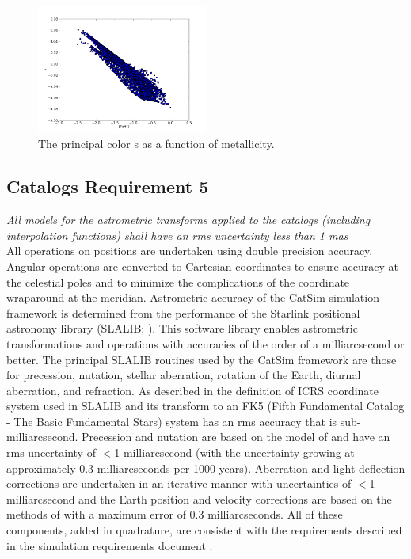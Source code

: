 \documentclass[11pt]{article}
\begin{document}
\begin{figure} [h]
\centering
\includegraphics[width=0.5\textwidth]{validation_figures/s_met.png}
\caption{The principal color s as a function of metallicity.\label{fig:sfeh}}
\end{figure}


\subsection{Catalogs Requirement 5}

{\it All models for the astrometric transforms applied to the catalogs
  (including interpolation functions) shall have an rms uncertainty less than 1 mas}\\

All operations on positions are undertaken using double precision
accuracy. Angular operations are converted to Cartesian coordinates to
ensure accuracy at the celestial poles and to minimize the
complications of the coordinate wraparound at the
meridian. Astrometric accuracy of the CatSim simulation framework is
determined from the performance of the Starlink positional astronomy
library (SLALIB; \citealt{wallace}). This software library enables
astrometric transformations and operations with accuracies of the
order of a milliarcsecond or better.  The principal SLALIB routines
used by the CatSim framework are those for precession, nutation,
stellar aberration, rotation of the Earth, diurnal aberration, and
refraction.  As described in \citet{wallace} the definition of ICRS
coordinate system used in SLALIB and its transform to an FK5 (Fifth
Fundamental Catalog - The Basic Fundamental Stars) system has an rms
accuracy that is sub-milliarcsecond. Precession and nutation are based
on the model of \citet{SF2001} and have an rms uncertainty of $<$1
milliarcsecond (with the uncertainty growing at approximately 0.3
milliarcseconds per 1000 years). Aberration and light deflection
corrections are undertaken in an iterative manner with uncertainties
of $<$1 milliarcsecond and the Earth position and velocity corrections
are based on the methods of \citep{stumpff} with a maximum error of
0.3 milliarcseconds. All of these components, added in quadrature, are
consistent with the requirements described in the simulation
requirements document \citet{requirements}.
\end{document}
